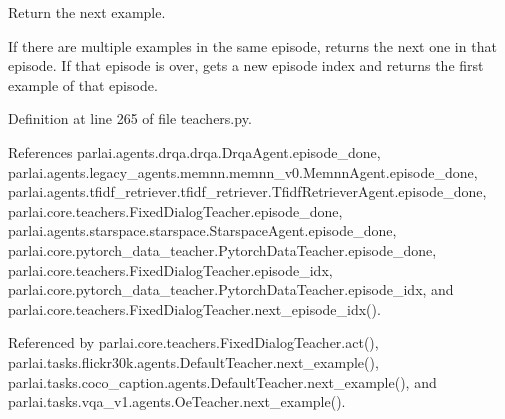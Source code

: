 \begin{DoxyVerb}Return the next example.

If there are multiple examples in the same episode, returns the next
one in that episode. If that episode is over, gets a new episode index
and returns the first example of that episode.
\end{DoxyVerb}
 

Definition at line 265 of file teachers.\+py.



References parlai.\+agents.\+drqa.\+drqa.\+Drqa\+Agent.\+episode\+\_\+done, parlai.\+agents.\+legacy\+\_\+agents.\+memnn.\+memnn\+\_\+v0.\+Memnn\+Agent.\+episode\+\_\+done, parlai.\+agents.\+tfidf\+\_\+retriever.\+tfidf\+\_\+retriever.\+Tfidf\+Retriever\+Agent.\+episode\+\_\+done, parlai.\+core.\+teachers.\+Fixed\+Dialog\+Teacher.\+episode\+\_\+done, parlai.\+agents.\+starspace.\+starspace.\+Starspace\+Agent.\+episode\+\_\+done, parlai.\+core.\+pytorch\+\_\+data\+\_\+teacher.\+Pytorch\+Data\+Teacher.\+episode\+\_\+done, parlai.\+core.\+teachers.\+Fixed\+Dialog\+Teacher.\+episode\+\_\+idx, parlai.\+core.\+pytorch\+\_\+data\+\_\+teacher.\+Pytorch\+Data\+Teacher.\+episode\+\_\+idx, and parlai.\+core.\+teachers.\+Fixed\+Dialog\+Teacher.\+next\+\_\+episode\+\_\+idx().



Referenced by parlai.\+core.\+teachers.\+Fixed\+Dialog\+Teacher.\+act(), parlai.\+tasks.\+flickr30k.\+agents.\+Default\+Teacher.\+next\+\_\+example(), parlai.\+tasks.\+coco\+\_\+caption.\+agents.\+Default\+Teacher.\+next\+\_\+example(), and parlai.\+tasks.\+vqa\+\_\+v1.\+agents.\+Oe\+Teacher.\+next\+\_\+example().


